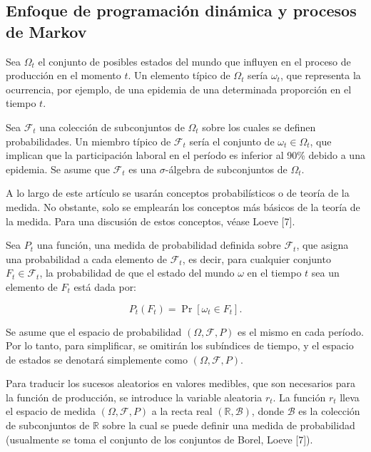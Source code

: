 \documentclass[a4paper,12pt]{article}
\begin{document}
	
	\subsection{Enfoque de programación dinámica y procesos de Markov}

 Sea \( \Omega_t \) el conjunto de posibles estados del mundo que influyen en el proceso de producción en el momento \( t \). Un elemento típico de \( \Omega_t \) sería \( \omega_t \), que representa la ocurrencia, por ejemplo, de una epidemia de una determinada proporción en el tiempo \( t \).

Sea \( \mathcal{F}_t \) una colección de subconjuntos de \( \Omega_t \) sobre los cuales se definen probabilidades. Un miembro típico de \( \mathcal{F}_t \) sería el conjunto de \( \omega_t \in \Omega_t \), que implican que la participación laboral en el período es inferior al 90\% debido a una epidemia. Se asume que \( \mathcal{F}_t \) es una \( \sigma \)-álgebra de subconjuntos de \( \Omega_t \).

A lo largo de este artículo se usarán conceptos probabilísticos o de teoría de la medida. No obstante, solo se emplearán los conceptos más básicos de la teoría de la medida. Para una discusión de estos conceptos, véase Loeve [7].

Sea \( P_t \) una función, una medida de probabilidad definida sobre \( \mathcal{F}_t \), que asigna una probabilidad a cada elemento de \( \mathcal{F}_t \), es decir, para cualquier conjunto \( F_t \in \mathcal{F}_t \), la probabilidad de que el estado del mundo \( \omega \) en el tiempo \( t \) sea un elemento de \( F_t \) está dada por:

		\begin{equation}
P_t(F_t) = \Pr[\omega_t \in F_t].
		\end{equation}

Se asume que el espacio de probabilidad \( (\Omega, \mathcal{F}, P) \) es el mismo en cada período. Por lo tanto, para simplificar, se omitirán los subíndices de tiempo, y el espacio de estados se denotará simplemente como \( (\Omega, \mathcal{F}, P) \).

Para traducir los sucesos aleatorios en valores medibles, que son necesarios para la función de producción, se introduce la variable aleatoria \( r_t \). La función \( r_t \) lleva el espacio de medida \( (\Omega, \mathcal{F}, P) \) a la recta real \( (\mathbb{R}, \mathcal{B}) \), donde \( \mathcal{B} \) es la colección de subconjuntos de \( \mathbb{R} \) sobre la cual se puede definir una medida de probabilidad (usualmente se toma el conjunto de los conjuntos de Borel, Loeve [7]).
\end{document}
